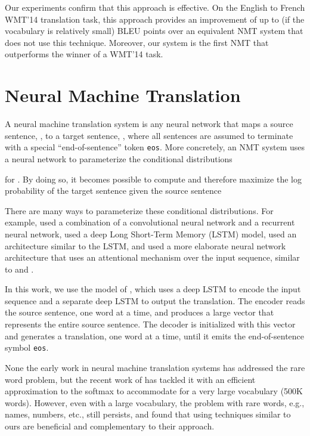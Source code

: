 \documentclass[11pt]{article}
\newcommand{\edit}[1]{{#1}} \newcommand{\hide}[1]{}
\newcommand{\eossym}{\texttt{eos}}
\begin{document}
Our experiments confirm that this approach is effective. On the English to French WMT'14
translation task, this approach provides an improvement of
up to \bestunkimp{} (if the vocabulary is relatively small) 
BLEU points over an equivalent NMT system that does not use this technique.
Moreover, our system is the first NMT that outperforms the winner of a WMT'14 task.


 
\section{Neural Machine Translation}
\label{sec:nmt}

A neural machine translation system is any neural network that maps a source 
sentence, ,
to a target sentence, , where all sentences are assumed to 
terminate with a special
``end-of-sentence'' token \eossym{}.  More concretely, an NMT system uses a neural 
network to parameterize the conditional distributions

for .  By doing so, it becomes possible to 
compute and therefore maximize the log probability
of the target sentence given the source sentence

There are many ways to parameterize these conditional distributions.
For example,  used a combination of a
convolutional neural network and a recurrent neural network,  used a deep Long Short-Term Memory
(LSTM) model,  used an architecture similar to the LSTM, and
 used a more elaborate neural network
architecture that uses an attentional mechanism over the input sequence, 
similar to  and .  

In this work, we use the model of , which 
uses a deep LSTM to encode the input sequence and a separate deep LSTM 
to output the translation. The encoder reads the 
source sentence, one word at a time, and produces
a large vector that represents the entire source sentence. 
The decoder is initialized with this vector
and generates a translation, one word at a time, 
until it emits the end-of-sentence symbol \eossym{}.

None the early work in neural machine translation systems has addressed the rare word problem,
but the recent work of  has tackled it with 
\edit{an efficient approximation to the softmax to accommodate for a very large vocabulary (500K words). However, even with a large vocabulary, the problem with rare words, e.g., names, numbers, etc., still persists, and \newcite{jean15} found that using techniques similar to ours are beneficial and complementary to their approach.}
 
\end{document}
